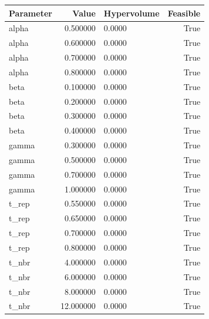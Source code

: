 \begin{tabular}{lrlr}
\toprule
Parameter & Value & Hypervolume & Feasible \\
\midrule
alpha & 0.500000 & 0.0000 & True \\
alpha & 0.600000 & 0.0000 & True \\
alpha & 0.700000 & 0.0000 & True \\
alpha & 0.800000 & 0.0000 & True \\
beta & 0.100000 & 0.0000 & True \\
beta & 0.200000 & 0.0000 & True \\
beta & 0.300000 & 0.0000 & True \\
beta & 0.400000 & 0.0000 & True \\
gamma & 0.300000 & 0.0000 & True \\
gamma & 0.500000 & 0.0000 & True \\
gamma & 0.700000 & 0.0000 & True \\
gamma & 1.000000 & 0.0000 & True \\
t_rep & 0.550000 & 0.0000 & True \\
t_rep & 0.650000 & 0.0000 & True \\
t_rep & 0.700000 & 0.0000 & True \\
t_rep & 0.800000 & 0.0000 & True \\
t_nbr & 4.000000 & 0.0000 & True \\
t_nbr & 6.000000 & 0.0000 & True \\
t_nbr & 8.000000 & 0.0000 & True \\
t_nbr & 12.000000 & 0.0000 & True \\
\bottomrule
\end{tabular}
